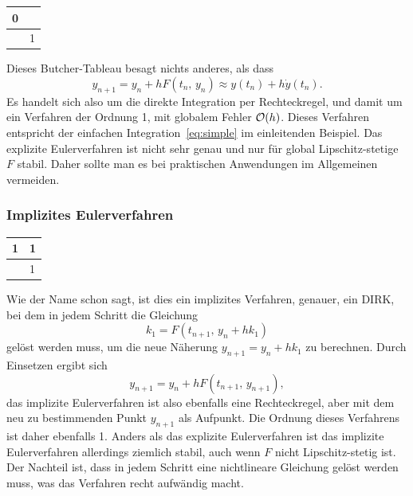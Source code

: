 \begin{center}
  \renewcommand{\arraystretch}{1.3}
  \begin{tabular}{r|l}
    0 & \\\hline
    & 1
  \end{tabular}
\end{center}
Dieses Butcher-Tableau besagt nichts anderes, als dass
\begin{equation}
  y_{n+1} = y_n + h F(t_n,\, y_n) \approx y(t_n) + h \dot y(t_n).
\end{equation}
Es handelt sich also um die direkte Integration per Rechteckregel, und
damit um ein Verfahren der Ordnung 1, \dh mit globalem Fehler
$\mathcal O(h)$. Dieses Verfahren entspricht der einfachen
Integration~\eqref{eq:simple} im einleitenden Beispiel. Das explizite
Eulerverfahren ist nicht sehr genau und nur für global
Lipschitz-stetige $F$ stabil. Daher sollte man es bei praktischen
Anwendungen im Allgemeinen vermeiden.

\subsubsection{Implizites Eulerverfahren}

\begin{center}
  \renewcommand{\arraystretch}{1.3}
  \begin{tabular}{r|l}
    1 & 1\\\hline
    & 1
  \end{tabular}
\end{center}
Wie der Name schon sagt, ist dies ein implizites Verfahren, genauer,
ein DIRK, bei dem in jedem Schritt die Gleichung
\begin{equation}
  k_1 = F(t_{n+1},\,y_n + h k_1)
\end{equation}
gelöst werden muss, um die neue Näherung $y_{n+1} = y_n + h k_1$ zu
berechnen. Durch Einsetzen ergibt sich
\begin{equation}
  y_{n+1} = y_n + h F(t_{n+1},\, y_{n+1}),
\end{equation}
das implizite Eulerverfahren ist also ebenfalls eine Rechteckregel,
aber mit dem neu zu bestimmenden Punkt $y_{n+1}$ als Aufpunkt. Die
Ordnung dieses Verfahrens ist daher ebenfalls 1. Anders als das
explizite Eulerverfahren ist das implizite Eulerverfahren allerdings
ziemlich stabil, auch wenn $F$ nicht Lipschitz-stetig ist. Der
Nachteil ist, dass in jedem Schritt eine nichtlineare Gleichung gelöst
werden muss, was das Verfahren recht aufwändig macht.

